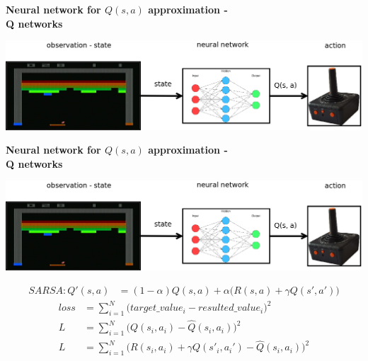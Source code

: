 \documentclass[xcolor=dvipsnames]{beamer}
\begin{document}
\begin{frame}{\bf Neural network for $Q(s, a)$ approximation - \\ Q networks}

\centering
\includegraphics[scale=0.18]{../../diagrams/q_net.png}

\end{frame}

\begin{frame}{\bf Neural network for $Q(s, a)$ approximation - \\ Q networks}

\centering
\includegraphics[scale=0.13]{../../diagrams/q_net.png}

\begin{align*}
SARSA : Q'(s, a) &= (1-\alpha)Q(s, a) + \alpha\Big(R(s, a) + \gamma Q(s', a')\Big)
\end{align*}
\begin{align*}
  loss   &= \sum_{i=1}^{N} \Big(target\_value_i - resulted\_value_i\Big)^2 \\
  L   &= \sum_{i=1}^{N} \Big(Q(s_i, a_i) - \hat{Q}(s_i, a_i)\Big)^2 \\
  L   &= \sum_{i=1}^{N} \Big(R(s_i, a_i) + \gamma Q(s'_i, a_i') - \hat{Q}(s_i, a_i)\Big)^2
\end{align*}

\end{frame}
\end{document}
